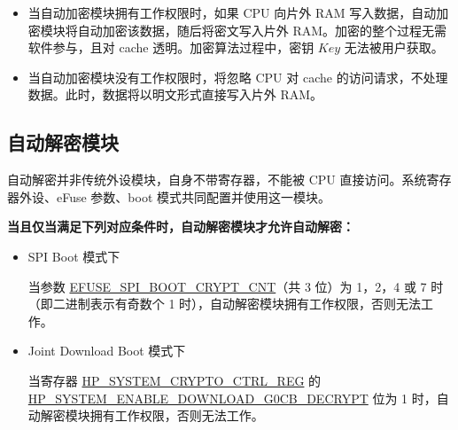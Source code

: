 \documentclass[main\_\_CN.tex]{subfiles}
\begin{document}
\begin{tiplisting}
\vspace{-2em}
\begin{itemize}

\item 当自动加密模块拥有工作权限时，如果 CPU 向片外 RAM 写入数据，自动加密模块将自动加密该数据，随后将密文写入片外 RAM。加密的整个过程无需软件参与，且对 cache 透明。加密算法过程中，密钥 \begin{math}\mathit{Key}\end{math} 无法被用户获取。

\item 当自动加密模块没有工作权限时，将忽略 CPU 对 cache 的访问请求，不处理数据。此时，数据将以明文形式直接写入片外 RAM。


\end{itemize}
\end{tiplisting}


\subsection{自动解密模块}

自动解密并非传统外设模块，自身不带寄存器，不能被 CPU 直接访问。系统寄存器外设、eFuse 参数、boot 模式共同配置并使用这一模块。

\textbf{当且仅当满足下列对应条件时，自动解密模块才允许自动解密：}

\begin{itemize}

    \item SPI Boot 模式下

    当参数 \hyperref[fielddesc:EFUSESPIBOOTCRYPTCNT]{EFUSE\_SPI\_BOOT\_CRYPT\_CNT}（共 3 位）为 1，2，4 或 7 时（即二进制表示有奇数个 1 时），自动解密模块拥有工作权限，否则无法工作。
    \item Joint Download Boot 模式下

    当寄存器 \hyperref[regdesc:HPSYSTEMCRYPTOCTRLREG]{HP\_SYSTEM\_CRYPTO\_CTRL\_REG} 的 \\ \hyperref[fielddesc:HPSYSTEMENABLEDOWNLOADG0CBDECRYPT]{HP\_SYSTEM\_ENABLE\_DOWNLOAD\_G0CB\_DECRYPT} 位为 1 时，自动解密模块拥有工作权限，否则无法工作。

\end{itemize}
\end{document}
